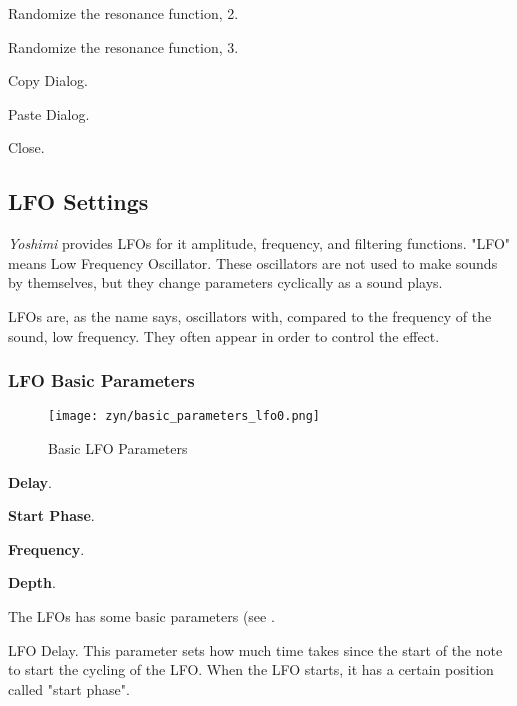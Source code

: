   Randomize the resonance function, 2.

   Randomize the resonance function, 3.

   Copy Dialog.

   Paste Dialog.

   Close.

\subsection{LFO Settings}
\label{subsec:lfo_settings}

   \textsl{Yoshimi} provides LFOs for it amplitude, frequency, and filtering
   functions.
   "LFO" means Low Frequency Oscillator. These oscillators are not used to make
   sounds by themselves, but they change parameters cyclically as a sound
   plays.

   LFOs are, as the name says, oscillators with, compared to the frequency of
   the sound, low frequency. They often appear in order to control the
   effect.

\subsubsection{LFO Basic Parameters}
\label{subsubsec:lfo_basic_parameters}

\begin{figure}[H]
   \centering
   \texttt{[image: zyn/basic\_parameters\_lfo0.png]}
   \caption[Basic LFO Parameters]{Basic LFO Parameters}
   \label{fig:basic_parameters_lfo}
\end{figure}

   \begin{enumber}
      \item \textbf{Delay}.
      \item \textbf{Start Phase}.
      \item \textbf{Frequency}.
      \item \textbf{Depth}.
   \end{enumber}

   The LFOs has some basic parameters (see
   .

   \setcounter{ItemCounter}{0}      %

   LFO Delay.
   This parameter sets how much time takes since the start of the note to
   start the cycling of the LFO.
   When the LFO starts, it has a certain position called "start phase".

